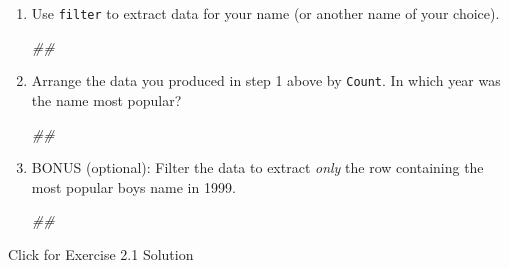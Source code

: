 \documentclass[
]{book}
\newenvironment{Shaded}{\begin{snugshade}}{\end{snugshade}}
\newcommand{\CommentTok}[1]{\textcolor[rgb]{0.56,0.35,0.01}{\textit{#1}}}
\begin{document}
\begin{enumerate}
\def\labelenumi{\arabic{enumi}.}
\item
  Use \texttt{filter} to extract data for your name (or another name of your choice).

\begin{Shaded}
\begin{Highlighting}[]
\CommentTok{\#\#}
\end{Highlighting}
\end{Shaded}
\item
  Arrange the data you produced in step 1 above by \texttt{Count}.
  In which year was the name most popular?

\begin{Shaded}
\begin{Highlighting}[]
\CommentTok{\#\#}
\end{Highlighting}
\end{Shaded}
\item
  BONUS (optional): Filter the data to extract \emph{only} the
  row containing the most popular boys name in 1999.

\begin{Shaded}
\begin{Highlighting}[]
\CommentTok{\#\#}
\end{Highlighting}
\end{Shaded}
\end{enumerate}

{Click for Exercise 2.1 Solution}
\end{document}
